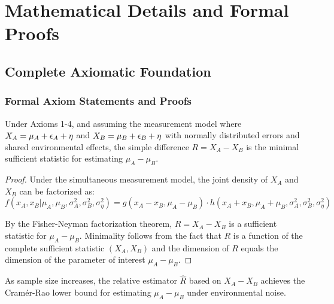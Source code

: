 
\appendix

\section{Mathematical Details and Formal Proofs}
\label{app:mathematical}

\subsection{Complete Axiomatic Foundation}

\subsubsection{Formal Axiom Statements and Proofs}

\begin{theorem}
\label{thm:minimal_sufficiency}
Under Axioms 1-4, and assuming the measurement model where $X_A = \mu_A + \epsilon_A + \eta$ and $X_B = \mu_B + \epsilon_B + \eta$ with normally distributed errors and shared environmental effects, the simple difference $R = X_A - X_B$ is the minimal sufficient statistic for estimating $\mu_A - \mu_B$.
\end{theorem}

\begin{proof}
Under the simultaneous measurement model, the joint density of $X_A$ and $X_B$ can be factorized as:
\begin{equation}
f(x_A, x_B | \mu_A, \mu_B, \sigma_A^2, \sigma_B^2, \sigma_\eta^2) = g(x_A - x_B, \mu_A - \mu_B) \cdot h(x_A + x_B, \mu_A + \mu_B, \sigma_A^2, \sigma_B^2, \sigma_\eta^2)
\end{equation}

By the Fisher-Neyman factorization theorem, $R = X_A - X_B$ is a sufficient statistic for $\mu_A - \mu_B$. Minimality follows from the fact that $R$ is a function of the complete sufficient statistic $(X_A, X_B)$ and the dimension of $R$ equals the dimension of the parameter of interest $\mu_A - \mu_B$.
\end{proof}

\begin{theorem}
\label{thm:asymptotic_efficiency}
As sample size increases, the relative estimator $\hat{R}$ based on $X_A - X_B$ achieves the Cramér-Rao lower bound for estimating $\mu_A - \mu_B$ under environmental noise.
\end{theorem}

